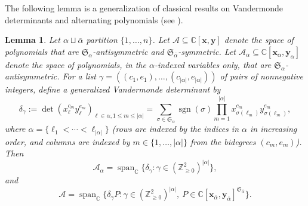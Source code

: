 \documentclass[11pt, noadjust, reqno]{amsart}
\newtheorem{lemma}[theorem]{Lemma}
\theoremstyle{definition}
\theoremstyle{remark}
\numberwithin{equation}{section}
\newcommand{\0}{\emptyset}
\newcommand{\Z}{\mathbb{Z}}
\newcommand{\C}{\mathbb{C}}
\DeclareMathOperator{\sgn}{sgn}
\DeclareMathOperator{\Span}{span}
\begin{document}
The following lemma is a generalization of classical results on Vandermonde determinants and alternating polynomials (see \cite[Chapter I.3]{Macdonald}).

\begin{lemma}\label{lem:generalized-Vandermonde}
Let $\alpha \sqcup {\overline{\alpha}}$ partition $\{1,\ldots,n\}$. 
Let $\mathcal A \subseteq \C[\bm{x},\bm{y}]$ denote the space of polynomials that are $\mathfrak{S}_\alpha$-antisymmetric and $\mathfrak{S}_{\overline{\alpha}}$-symmetric.
Let $\mathcal A_\alpha \subseteq \C[\bm{x}_\alpha,\bm{y}_\alpha]$ denote the space of polynomials, in the ${\alpha}$-indexed variables only, that are $\mathfrak{S}_{\alpha}$-antisymmetric.
For a list $\gamma = \left((c_1,e_1), \ldots, (c_{|{\alpha}|}, e_{|{\alpha}|}) \right)$ of pairs of nonnegative integers, define a generalized Vandermonde determinant by
\begin{equation*}
    \delta_\gamma := \det(x_\ell^{c_m} y_\ell^{e_m})_{\ell \in {\alpha}, 1 \leq m \leq |{\alpha}|} = \sum_{\sigma \in \mathfrak{S}_{\alpha}} \sgn(\sigma)\prod_{m=1}^{|{\alpha}|} x_{\sigma(\ell_m)}^{c_m} y_{\sigma(\ell_m)}^{e_m},
\end{equation*}
where ${\alpha} = \{\ell_1 < \cdots < \ell_{|{\alpha}|}\} $ (rows are indexed by the indices in ${\alpha}$ in increasing order, and columns are indexed by $m \in \{1,\ldots,|{\alpha}|\}$ from the bidegrees $(c_m,e_m)$).
Then 
\begin{equation*}
    \mathcal A_{\alpha} = \Span_\C \{ \delta_\gamma : \gamma \in \left(\Z_{\geq 0}^2\right)^{|{\alpha}|} \},
\end{equation*}
and
\begin{equation*}
    \mathcal A = \Span_\C \{ \delta_\gamma P : \gamma \in \left(\Z_{\geq 0}^2\right)^{|{\alpha}|}, \ P \in \C[\bm{x}_{\overline{\alpha}}, \bm{y}_{\overline{\alpha}}]^{\mathfrak{S}_{\overline{\alpha}}} \}.
\end{equation*}
\end{lemma}
\end{document}
